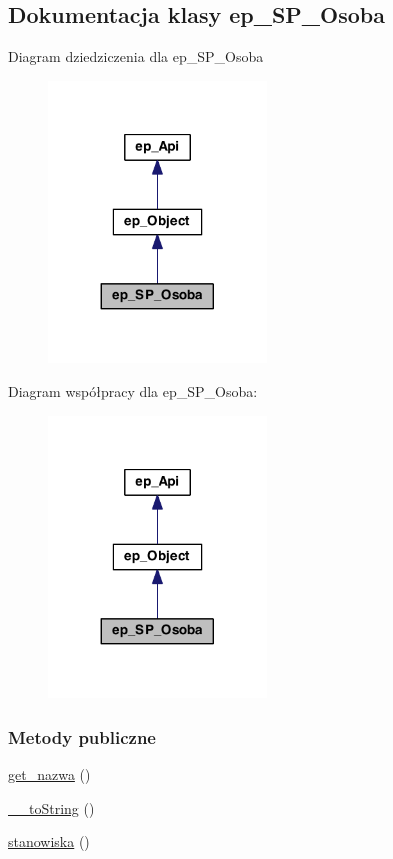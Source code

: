 \hypertarget{classep___s_p___osoba}{\subsection{Dokumentacja klasy ep\-\_\-\-S\-P\-\_\-\-Osoba}
\label{classep___s_p___osoba}
}


Diagram dziedziczenia dla ep\-\_\-\-S\-P\-\_\-\-Osoba\nopagebreak
\begin{figure}[H]
\begin{center}
\leavevmode
\includegraphics[width=164pt]{classep___s_p___osoba__inherit__graph}
\end{center}
\end{figure}


Diagram współpracy dla ep\-\_\-\-S\-P\-\_\-\-Osoba\-:\nopagebreak
\begin{figure}[H]
\begin{center}
\leavevmode
\includegraphics[width=164pt]{classep___s_p___osoba__coll__graph}
\end{center}
\end{figure}
\subsubsection*{Metody publiczne}
\begin{DoxyCompactItemize}
\item 
\hyperlink{classep___s_p___osoba_ac0818f0049d7b84f08f77128f54cee36}{get\-\_\-nazwa} ()
\item 
\hyperlink{classep___s_p___osoba_a7516ca30af0db3cdbf9a7739b48ce91d}{\-\_\-\-\_\-to\-String} ()
\item 
\hyperlink{classep___s_p___osoba_a9dd4480bf7002df382ab888d880131c2}{stanowiska} ()
\end{DoxyCompactItemize}
